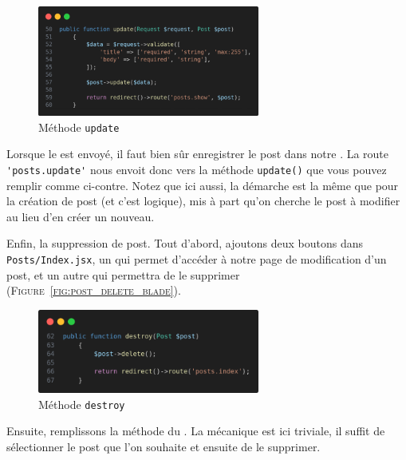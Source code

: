 \begin{figure}
    \vspace{-0.5cm}
    \includegraphics[width=0.65\textwidth]{figures-C1/postscontroller_update.png}
    \caption{Méthode \texttt{update}}
\end{figure}
Lorsque le \form{} est envoyé, il faut bien sûr enregistrer le post dans notre \db{}. La route \verb|'posts.update'| nous envoit donc vers la méthode \verb|update()| que vous pouvez remplir comme ci-contre. Notez que ici aussi, la démarche est la même que pour la création de post (et c'est logique), mis à part qu'on cherche le post à modifier au lieu d'en créer un nouveau.

\label{sec:posts_delete}

Enfin, la suppression de post. Tout d'abord, ajoutons deux boutons dans \verb|Posts/Index.jsx|, un qui permet d'accéder à notre page de modification d'un post, et un autre qui permettra de le supprimer (\textsc{Figure~\ref{fig:post_delete_blade}}).

\begin{figure}
    \vspace{-0.5cm}
    \includegraphics[width=0.65\textwidth]{figures-C1/postscontroller_destroy.png}
    \caption{Méthode \texttt{destroy}}
\end{figure}
Ensuite, remplissons la méthode du \controller{}. La mécanique est ici triviale, il suffit de sélectionner le post que l'on souhaite et ensuite de le supprimer.

